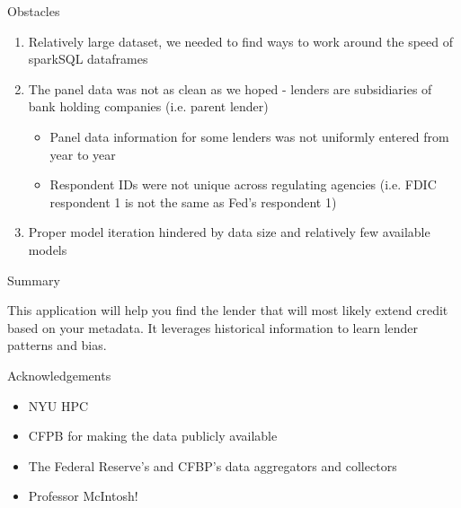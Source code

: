\documentclass{beamer}
\begin{document}
\begin{frame}{Obstacles}

\begin{enumerate}

\item Relatively large dataset, we needed to find ways to work around the speed of sparkSQL dataframes
\item The panel data was not as clean as we hoped - lenders are subsidiaries of bank holding companies (i.e. parent lender)
  \begin{itemize}
     \item Panel data information for some lenders was not uniformly entered from year to year
      \item Respondent IDs were not unique across regulating agencies (i.e. FDIC respondent 1 is not the same as Fed's respondent 1)
  \end{itemize}
\item Proper model iteration hindered by data size and relatively few available models

\end{enumerate}

\end{frame}



\begin{frame}{Summary}

This application will help you find the lender that will most likely extend credit based on your metadata.  It leverages historical information to learn lender patterns and bias.  

\end{frame}

\begin{frame}{Acknowledgements}

\begin{itemize}
  \item NYU HPC
  \item CFPB for making the data publicly available
  \item The Federal Reserve's and CFBP's data aggregators and collectors
  \item Professor McIntosh!

\end{itemize}

\end{frame}
\end{document}
